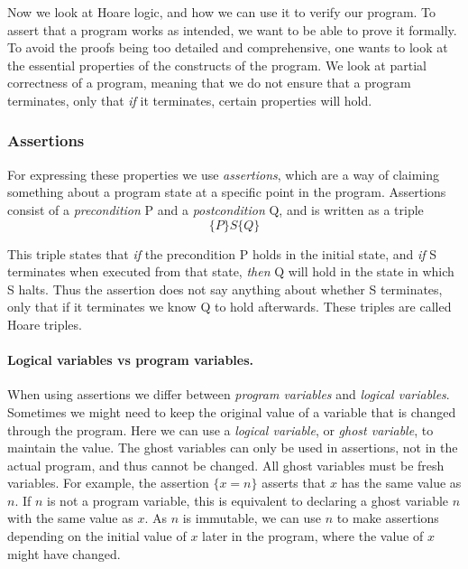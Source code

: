 Now we look at Hoare logic, and how we can use it to verify our program.
To assert that a program works as intended, we want to be able to prove it formally. To avoid the proofs being too detailed and comprehensive, one wants to look at the essential properties of the constructs of the program. We look at partial correctness of a program, meaning that we do not ensure that a program terminates, only that \textit{if} it terminates, certain properties will hold.

\subsubsection{Assertions}
For expressing these properties we use \textit{assertions}, which are a way of claiming something about a program state at a specific point in the program.
Assertions consist of a \textit{precondition} P and a \textit{postcondition} Q, and is written as a triple
$$ \{ P \} S \{ Q \} $$

This triple states that \textit{if} the precondition P holds in the initial state, and \textit{if} S terminates when executed from that state, \textit{then} Q will hold in the state in which S halts.
Thus the assertion does not say anything about whether S terminates, only that if it terminates we know Q to hold afterwards. These triples are called Hoare triples.

\paragraph{Logical variables vs program variables.}
When using assertions we differ between \textit{program variables} and \textit{logical variables}.
Sometimes we might need to keep the original value of a variable that is changed through the program. Here we can use a \textit{logical variable}, or \textit{ghost variable}, to maintain the value. The ghost variables can only be used in assertions, not in the actual program, and thus cannot be changed. All ghost variables must be fresh variables. 
For example, the assertion $\{x = n\}$ asserts that $x$ has the same value as $n$. If $n$ is not a program variable, this is equivalent to declaring a ghost variable $n$ with the same value as $x$. As $n$ is immutable, we can use $n$ to make assertions depending on the initial value of $x$ later in the program, where the value of $x$ might have changed.

